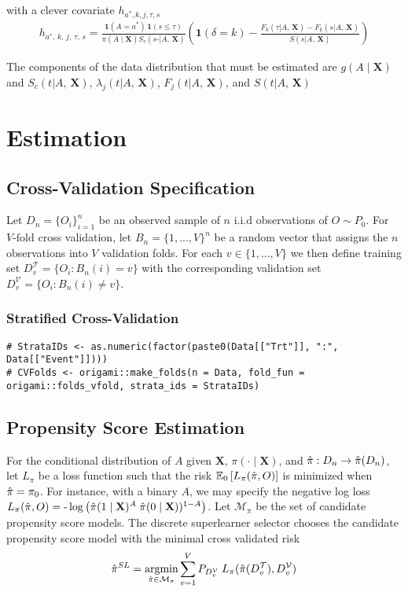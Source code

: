 \documentclass{report}
\newcommand{\1}{\ensuremath{\mathbf{1}}}
\DeclareMathOperator*{\argmin}{argmin}
\newcommand{\X}{\ensuremath{\mathbf{X}}}
\newcommand{\AX}{\ensuremath{\mid A,\,\mathbf{X}}}
\newcommand{\trt}{\ensuremath{a^*}}
\newcommand{\tk}{\ensuremath{\tau}}
\newcommand{\jj}{\ensuremath{k}}
\newcommand{\g}{\ensuremath{\pi}}
\begin{document}
with a clever covariate  $h_{\trt, \jj, j, \tk, s}$ 
\begin{align*}
    h_{\trt,\, \jj,\, j,\, \tk,\, s} = \frac{\1(A = \trt)\, \1(s \leq \tk)}{\g(A \mid \X) S_c(s\text{-} \AX)} \left(\1(\delta = \jj) - \frac{F_\jj(\tk \AX) - F_\jj(s \AX)}{S(s \AX)}\right)
\end{align*}

The components of the data distribution that must be estimated are $g(A \mid \X)$ and $S_c(t \AX)$, $\lambda_j(t \AX)$, $F_j(t \AX)$, and $S(t \AX)$

\section*{Estimation}
\label{sec:org036f733}
\subsection*{Cross-Validation Specification}
\label{sec:org0c0a4a1}
Let \(D_n = \{O_i\}_{i=1}^n\) be an observed sample of \(n\) i.i.d observations of \(O \sim P_0\). For \(V\text{-fold}\) cross validation, let \(B_n = \{1, ... , V\}^n\) be a random vector that assigns the \(n\) observations into \(V\) validation folds. For each \(v \in \{1, ..., V\}\) we then define training set \(D^\mathcal{T}_v = \{O_i : B_n(i) = v\}\) with the corresponding validation set \(D^\mathcal{V}_v = \{O_i : B_n(i) \neq v\}\).

\subsubsection*{Stratified Cross-Validation}
\label{sec:org428689e}

\begin{lstlisting}
# StrataIDs <- as.numeric(factor(paste0(Data[["Trt"]], ":", Data[["Event"]])))
# CVFolds <- origami::make_folds(n = Data, fold_fun = origami::folds_vfold, strata_ids = StrataIDs)
\end{lstlisting}

\subsection*{Propensity Score Estimation}
\label{sec:orgd2f7326}

For the conditional distribution of $A$ given $\X$, $\pi(\cdot \mid \X)$, and $\Hat{\pi} : D_n \to \Hat{\pi}(D_n)$, let $L_\pi$ be a loss function such that the risk $\mathbb{E}_0\left[L_\pi(\Hat{\pi}, O)\right]$ is minimized when $\Hat{\pi} = \pi_0$. For instance, with a binary $A$, we may specify the negative log loss $L_\pi(\Hat{\pi}, O) = \text{-}\log\left(\Hat{\pi}(1 \mid \X)^A \; \Hat{\pi}(0 \mid \X))^{1-A}\right)$. Let $\mathcal{M_\pi}$ be the set of candidate propensity score models. The discrete superlearner selector chooses the candidate propensity score model with the minimal cross validated risk 
\[ \Hat{\pi}^{SL} = \argmin_{\Hat{\pi} \in \mathcal{M}_\pi} \sum_{v = 1}^{V} P_{D^\mathcal{V}_v} \; L_\pi(\Hat{\pi}(D^\mathcal{T}_v), D^\mathcal{V}_v)\]
\end{document}
